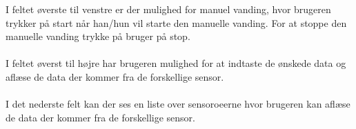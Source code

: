 I feltet øverste til venstre er der mulighed for manuel vanding, hvor brugeren trykker på start når han/hun vil starte den manuelle vanding. For at stoppe den manuelle vanding trykke på bruger på stop.   
\\\\
I feltet øverst til højre har brugeren mulighed for at indtaste de ønskede data og aflæse de data der kommer fra de forskellige sensor. 
\\\\
I det nederste felt kan der ses en liste over \gls{sensoroe}erne hvor brugeren kan aflæse de data der kommer fra de forskellige sensor.   